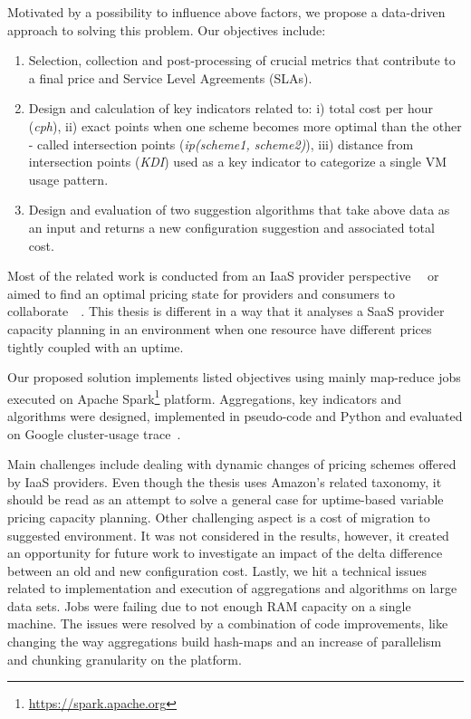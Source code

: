 \documentclass[]{final_report}
\begin{document}
Motivated by a possibility to influence above factors, we propose a data-driven approach to solving this problem. Our objectives include:
\begin{enumerate}
\item Selection, collection and post-processing of crucial metrics that contribute to a final price and Service Level Agreements (SLAs).
\item Design and calculation of key indicators related to: i) total cost per hour (\textit{cph}), ii) exact points when one scheme becomes more optimal than the other - called intersection points (\textit{ip(scheme1, scheme2)}), iii) distance from intersection points (\textit{KDI}) used as a key indicator to categorize a single VM usage pattern.
\item Design and evaluation of two suggestion algorithms that take above data as an input and returns a new configuration suggestion and associated total cost.
\end{enumerate}


Most of the related work is conducted from an IaaS provider perspective~\cite{6274129}~\cite{6253563} or aimed to find an optimal pricing state for providers and consumers to collaborate~\cite{6676685}~\cite{6963393}. This thesis is different in a way that it analyses a SaaS provider capacity planning in an environment when one resource have different prices tightly coupled with an uptime.


Our proposed solution implements listed objectives using mainly map-reduce jobs executed on Apache Spark\footnote{\url{https://spark.apache.org}} platform. Aggregations, key indicators and algorithms were designed, implemented in pseudo-code and Python and evaluated on Google cluster-usage trace~\cite{clusterdata:Reiss2011}. 


Main challenges include dealing with dynamic changes of pricing schemes offered by IaaS providers. Even though the thesis uses Amazon's related taxonomy, it should be read as an attempt to solve a general case for uptime-based variable pricing capacity planning. Other challenging aspect is a cost of migration to suggested environment. It was not considered in the results, however, it created an opportunity for future work to investigate an impact of the delta difference between an old and new configuration cost. Lastly, we hit a technical issues related to implementation and execution of aggregations and algorithms on large data sets. Jobs were failing due to not enough RAM capacity on a single machine. The issues were resolved by a combination of code improvements, like changing the way aggregations build hash-maps and an increase of parallelism and chunking granularity on the platform.
\end{document}
